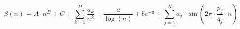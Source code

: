 \[
\boxed{
\beta(n) = A \cdot n^B + C + \sum_{k=1}^{M} \frac{a_k}{n^k}
           + \frac{a}{\log(n)} + b e^{-\pi}
           + \sum_{j=1}^N a_j \cdot \sin\left(2\pi \cdot \frac{p_j}{q_j} \cdot n\right)
}
\]